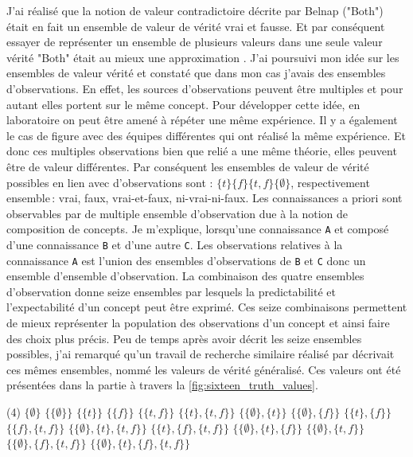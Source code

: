 \begin{refsegment}
J'ai réalisé que la notion de valeur contradictoire décrite par Belnap ("Both") était en fait un ensemble de valeur de vérité vrai et fausse. Et par conséquent essayer de représenter un ensemble de plusieurs valeurs dans une seule valeur vérité "Both" était au mieux une approximation . J'ai poursuivi mon idée sur les ensembles de valeur vérité et constaté que dans mon cas j'avais des ensembles d'observations. En effet, les sources d'observations peuvent être multiples et pour autant elles portent sur le même concept. Pour développer cette idée, en laboratoire on peut être amené à répéter une même expérience. Il y a également le cas de figure avec des équipes différentes qui ont réalisé la même expérience. Et donc ces multiples observations bien que relié a une même théorie, elles peuvent être de valeur différentes. Par conséquent les ensembles de valeur de vérité possibles en lien avec d'observations sont : $\{t\} \{f\} \{t,f\} \{\emptyset\}$, respectivement ensemble : vrai, faux, vrai-et-faux, ni-vrai-ni-faux. Les connaissances a priori sont observables par de multiple ensemble d'observation due à la notion de composition de concepts. Je m'explique, lorsqu'une connaissance \texttt{A} et composé d'une connaissance \texttt{B} et d'une autre \texttt{C}. Les observations relatives à la  connaissance \texttt{A} est l'union des ensembles d'observations de \texttt{B} et \texttt{C} donc un ensemble d'ensemble d'observation. La combinaison des quatre ensembles d'observation donne seize ensembles par lesquels la predictabilité et l'expectabilité d'un concept peut être exprimé. Ces seize combinaisons permettent de mieux représenter la population des observations d'un concept et ainsi faire des choix plus précis. Peu de temps après avoir décrit les seize ensembles possibles, j'ai remarqué qu'un travail de recherche similaire réalisé par \citeauthor{shramko2005some} décrivait ces mêmes ensembles, nommé les valeurs de vérité généralisé. Ces valeurs ont été présentées dans la partie   à travers la \cref{fig:sixteen_truth_values}.

\begin{tasks}[counter-format = {tsk[1].},label-offset = {0.8em},label-format = {\bfseries}](4)
	\task $\{\emptyset\}$
	\task $\{\{\emptyset\}\}$
	\task $\{\{t\}\}$
	\task $\{\{f\}\}$
	\task $\{\{t,f\}\}$
	\task $\{\{t\},\{t,f\}\}$
	\task $\{\{\emptyset\},\{t\}\}$
	\task $\{\{\emptyset\},\{f\}\}$
	\task $\{\{t\},\{f\}\}$
	\task $\{\{f\},\{t,f\}\}$
	\task $\{\{\emptyset\},\{t\},\{t,f\}\}$
	\task $\{\{t\},\{f\},\{t,f\}\}$
	\task $\{\{\emptyset\},\{t\},\{f\}\}$
	\task $\{\{\emptyset\},\{t,f\}\}$
	\task $\{\{\emptyset\},\{f\},\{t,f\}\}$
	\task $\{\{\emptyset\},\{t\},\{f\},\{t,f\}\}$
\end{tasks}





\end{refsegment}
